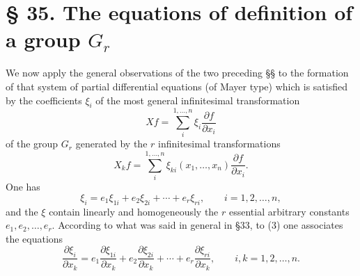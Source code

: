 \documentclass[11pt]{book}
\begin{document}
\section*{\S{} 35. The equations of definition of a group $G_r$}

We now apply the general observations of the two preceding \S\S{} to the formation of that system of partial differential equations (of Mayer type) which is satisfied by the coefficients $\xi_i$ of the most general infinitesimal transformation
\[
 Xf=\sum\limits_i^{1,\ldots,n}\xi_i\frac{\partial f}{\partial x_i}
\]
of the group $G_r$ generated by the $r$ infinitesimal transformations
\[
 X_k f=\sum\limits_i^{1,\ldots,n}\xi_{ki}(x_1,\ldots,x_n)\frac{\partial f}{\partial x_i}.
\]
One has
\begin{equation*}\tag{3}
 \xi_i=e_1\xi_{1i}+e_2\xi_{2i}+\cdots+e_r\xi_{ri},
 \qquad i=1,2,\ldots,n,
\end{equation*}
and the $\xi$ contain linearly and homogeneously the $r$ essential arbitrary constants $e_1,e_2,\ldots,e_r$. According to what was said in general in \S{}33, to (3) one associates the equations
\begin{equation*}\tag{$3_1$}
 \frac{\partial\xi_i}{\partial x_k}
  =e_1\frac{\partial\xi_{1i}}{\partial x_k}
  +e_2\frac{\partial\xi_{2i}}{\partial x_k}
  +\cdots
  +e_r\frac{\partial\xi_{ri}}{\partial x_k},
 \qquad i,k=1,2,\ldots,n.
\end{equation*}
\end{document}
